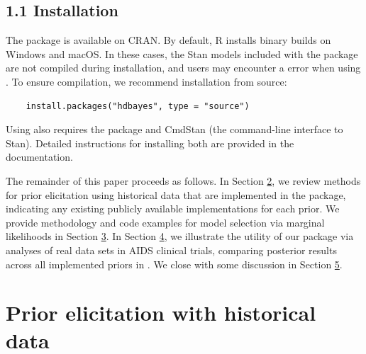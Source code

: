 \subsection{1.1 Installation}
The package  is available on CRAN. By default, R installs binary builds on Windows and macOS. In these cases, the Stan models included with the package are not compiled during installation, and users may encounter a  error when using . To ensure compilation, we recommend installation from source:
\begin{verbatim}
    install.packages("hdbayes", type = "source")
\end{verbatim}
Using  also requires the package  and  CmdStan (the command-line interface to Stan). Detailed instructions for installing both are provided in the  documentation.

The remainder of this paper proceeds as follows. 
In Section \hyperref[sec:priorelicit]{2}, we review methods for prior elicitation using historical data that are implemented in the  package, indicating any existing publicly available implementations for each prior. 
We provide methodology and code examples for model selection via marginal likelihoods in Section \hyperref[sec:normconst]{3}. 
In Section \hyperref[sec:dataanalysis]{4}, we illustrate the utility of our package via analyses of real data sets in AIDS clinical trials, comparing posterior results across all implemented priors in .
We close with some discussion in Section \hyperref[sec:discussion]{5}. 

\section[Prior elicitation with historical data]{Prior elicitation with historical data} \label{sec:priorelicit}

